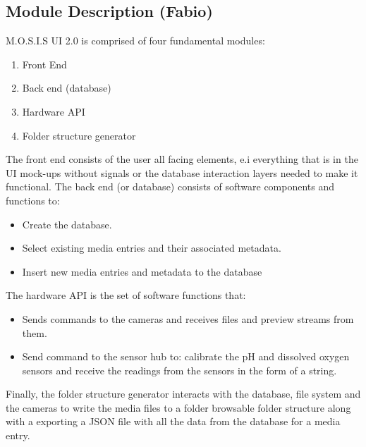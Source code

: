 \subsection{Module Description (Fabio)}
M.O.S.I.S UI 2.0 is comprised of four fundamental modules:
\begin{enumerate}
	\item Front End
	\item Back end (database)
	\item Hardware API
	\item Folder structure generator
\end{enumerate}
The front end consists of the user all facing elements, e.i everything that is in the UI mock-ups without signals or the database interaction layers needed to make it functional. The back end (or database) consists of software components and functions to:
\begin{itemize}
	\item Create the database.
	\item Select existing media entries and their associated metadata.
	\item Insert new media entries and metadata to the database
\end{itemize}
The hardware API is the set of software functions that:
\begin{itemize}
	\item Sends commands to the cameras and receives files and preview streams from them.
	\item Send command to the sensor hub to: calibrate the pH and dissolved oxygen sensors and receive the readings from the sensors in the form of a string.
\end{itemize}
Finally, the folder structure generator interacts with the database, file system and the cameras to write the media files to a folder browsable folder structure along with a exporting a JSON file with all the data from the database for a media entry.